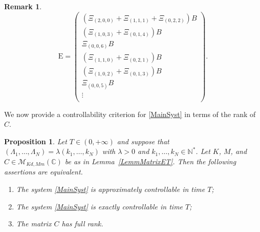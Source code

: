 \documentclass[10pt]{amsart}
\theoremstyle{plain}
\newtheorem{prop}[theo]{Proposition}
\theoremstyle{definition}
\newtheorem{remk}[theo]{Remark}
\newcommand{\Epsilon}{\mathrm E}
\begin{document}
\begin{remk}
\[
\Epsilon =
\begin{pmatrix}
\left(\Xi_{(2, 0, 0)} + \Xi_{(1, 1, 1)} + \Xi_{(0, 2, 2)}\right) B \\
\left(\Xi_{(1, 0, 3)} + \Xi_{(0, 1, 4)}\right) B \\
\Xi_{(0, 0, 6)} B \\
\left(\Xi_{(1, 1, 0)} + \Xi_{(0, 2, 1)}\right) B \\
\left(\Xi_{(1, 0, 2)} + \Xi_{(0, 1, 3)}\right) B \\
\Xi_{(0, 0, 5)} B \\
\vdots \\
\end{pmatrix}.
\]
\end{remk}

We now provide a controllability criterion for \eqref{MainSyst} in terms of the rank of $C$.

\begin{prop}
\label{PropCommET}
Let $T \in (0, +\infty)$ and suppose that $(\Lambda_1, \dots, \Lambda_N) = \lambda (k_1, \dots, k_N)$ with $\lambda > 0$ and $k_1, \dots, k_N \in \mathbb N^\ast$. Let $K$, $M$, and $C \in \mathcal M_{Kd, Mm}(\mathbb C)$ be as in Lemma~\ref{LemmMatrixET}. Then the following assertions are equivalent.
\begin{enumerate}
\item\label{CtrlCommETApprox} The system \eqref{MainSyst} is approximately controllable in time $T$;
\item\label{CtrlCommETExact} The system \eqref{MainSyst} is exactly controllable in time $T$;
\item\label{CtrlCommETKalman} The matrix $C$ has full rank.
\end{enumerate}
\end{prop}
\end{document}

